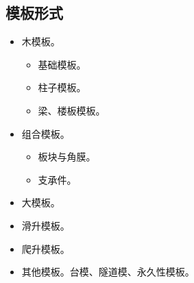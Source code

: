 \documentclass{book}
\begin{document}
\subsection{模板形式}
\begin{itemize}
    \item 木模板。
          \begin{itemize}
              \item 基础模板。
              \item 柱子模板。
              \item 梁、楼板模板。
          \end{itemize}
    \item 组合模板。
          \begin{itemize}
              \item 板块与角膜。
              \item 支承件。
          \end{itemize}
    \item 大模板。
    \item 滑升模板。
    \item 爬升模板。
    \item 其他模板。台模、隧道模、永久性模板。
\end{itemize}
\end{document}
